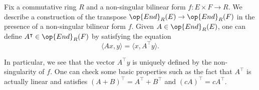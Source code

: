 \documentclass[../notes.tex]{subfiles}
\begin{document}
\begin{definition}[transpose]
	Fix a commutative ring $R$ and a non-singular bilinear form $f\colon E\times F\to R$. We describe a construction of the transpose $\op{End}_R(E)\to\op{End}_R(F)$ in the presence of a non-singular bilinear form $f$. Given $A\in\op{End}_R(E)$, one can define $A^\intercal\in\op{End}_R(F)$ by satisfying the equation
	\[\langle Ax,y\rangle=\langle x,A^\intercal y\rangle.\]
\end{definition}
In particular, we see that the vector $A^\intercal y$ is uniquely defined by the non-singularity of $f$. One can check some basic properties such as the fact that $A^\intercal$ is actually linear and satisfies $(A+B)^\intercal=A^\intercal+B^\intercal$ and $(cA)^\intercal=cA^\intercal$.
\end{document}
